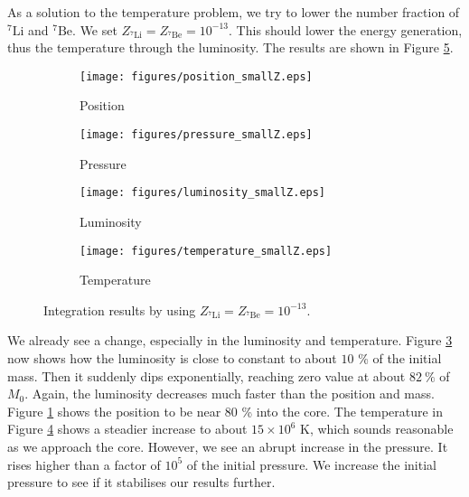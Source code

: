 \documentclass[a4paper, 11pt, english]{article}
\newcommand{\refig}[1]{\textcolor{blue}{\ref{fig:#1}}} %
\begin{document}
As a solution to the temperature problem, we try to lower the number fraction of
$^{7}\mathrm{Li}$ and $^{7}\mathrm{Be}$. We set $Z_{^{7}\mathrm{Li}} = Z_{^{7}\mathrm{Be}}
= 10^{-13}$. This should lower the energy generation, thus the temperature through the
luminosity. The results are shown in Figure \refig{smallZ}.
%
\begin{figure}[htpb]
	\begin{subfigure}{0.49\textwidth}
		\texttt{[image: figures/position\_smallZ.eps]}
		\caption{Position}
		\label{fig:position_smallZ}
	\end{subfigure}\hfill
	\begin{subfigure}{0.49\textwidth}
		\texttt{[image: figures/pressure\_smallZ.eps]}
		\caption{Pressure}
		\label{fig:pressure_smallZ}
	\end{subfigure}\hfill
	\vspace{0.35cm}
	\begin{subfigure}{0.49\textwidth}
		\texttt{[image: figures/luminosity\_smallZ.eps]}
		\caption{Luminosity}
		\label{fig:luminosity_smallZ}
	\end{subfigure}\hfill
	\begin{subfigure}{0.49\textwidth}
		\texttt{[image: figures/temperature\_smallZ.eps]}
		\caption{Temperature}
		\label{fig:temperature_smallZ}
	\end{subfigure}
	\vspace{0.2cm}
	\caption{Integration results by using $Z_{^{7}\mathrm{Li}} = Z_{^{7}\mathrm{Be}}
	= 10^{-13}$.}
	\label{fig:smallZ}
\end{figure}
%
We already see a change, especially in the luminosity and temperature. Figure
\refig{luminosity_smallZ} now shows how the luminosity is close to constant to about
$10$ \% of the initial mass. Then it suddenly dips exponentially, reaching zero value at
about $82 \ \%$ of $M_0$. Again, the luminosity decreases much faster than the position and
mass. Figure \refig{position_smallZ} shows the position to be near $80$ \% into the core.
The temperature in Figure \refig{temperature_smallZ} shows a steadier increase to about
$15 \times 10^6$ K, which sounds reasonable as we approach the core. However, we see an
abrupt increase in the pressure. It rises higher than a factor of $10^5$ of the initial
pressure. We increase the initial pressure to see if it stabilises our results further.
\end{document}
